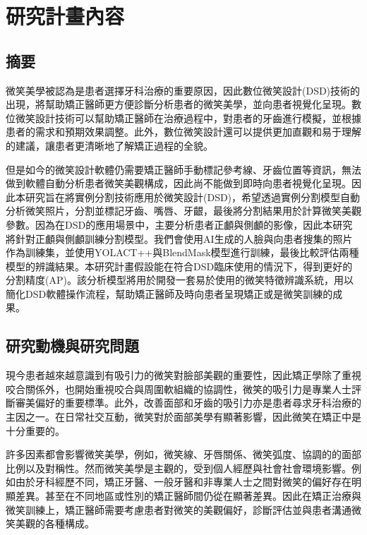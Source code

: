\raggedright
\setlength{\parindent}{2em} %
\newpage


\setcounter{section}{1}


\section{研究計畫內容}

\subsection{摘要}
微笑美學被認為是患者選擇牙科治療的重要原因，因此數位微笑設計(DSD)技術的出現，將幫助矯正醫師更方便診斷分析患者的微笑美學，並向患者視覺化呈現。數位微笑設計技術可以幫助矯正醫師在治療過程中，對患者的牙齒進行模擬，並根據患者的需求和預期效果調整。此外，數位微笑設計還可以提供更加直觀和易于理解的建議，讓患者更清晰地了解矯正過程的全貌。

但是如今的微笑設計軟體仍需要矯正醫師手動標記參考線、牙齒位置等資訊，無法做到軟體自動分析患者微笑美觀構成，因此尚不能做到即時向患者視覺化呈現。因此本研究旨在將實例分割技術應用於微笑設計(DSD)，希望透過實例分割模型自動分析微笑照片，分割並標記牙齒、嘴唇、牙齦，最後將分割結果用於計算微笑美觀參數。因為在DSD的應用場景中，主要分析患者正顱與側顱的影像，因此本研究將針對正顱與側顱訓練分割模型。我們會使用AI生成的人臉與向患者搜集的照片作為訓練集，並使用YOLACT++與BlendMask模型進行訓練，最後比較評估兩種模型的辨識結果。本研究計畫假設能在符合DSD臨床使用的情況下，得到更好的分割精度(AP)。該分析模型將用於開發一套易於使用的微笑特徵辨識系統，用以簡化DSD軟體操作流程，幫助矯正醫師及時向患者呈現矯正或是微笑訓練的成果。




 

\newpage
\subsection{研究動機與研究問題}


現今患者越來越意識到有吸引力的微笑對臉部美觀的重要性，因此矯正學除了重視咬合關係外，也開始重視咬合與周圍軟組織的協調性，微笑的吸引力是專業人士評斷審美偏好的重要標準。此外，改善面部和牙齒的吸引力亦是患者尋求牙科治療的主因之一。在日常社交互動，微笑對於面部美學有顯著影響，因此微笑在矯正中是十分重要的。

許多因素都會影響微笑美學，例如，微笑線、牙唇關係、微笑弧度、協調的的面部比例以及對稱性。然而微笑美學是主觀的，受到個人經歷與社會社會環境影響。例如由於牙科經歷不同，矯正牙醫、一般牙醫和非專業人士之間對微笑的偏好存在明顯差異。甚至在不同地區或性別的矯正醫師間仍從在顯著差異。因此在矯正治療與微笑訓練上，矯正醫師需要考慮患者對微笑的美觀偏好，診斷評估並與患者溝通微笑美觀的各種構成。


